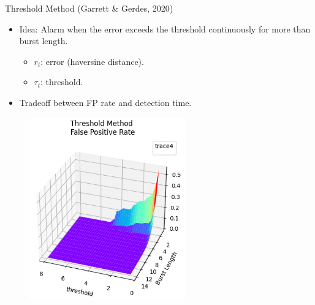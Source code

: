 \documentclass[aspectratio=169, 8pt]{beamer}
\begin{document}
\begin{frame}


\begin{columns}[T]

    \begin{column}{0.5\linewidth}
    
        \begin{block}{Threshold Method (Garrett \& Gerdes, 2020)}
            \begin{itemize}
                \item Idea: Alarm when the error exceeds the threshold continuously for more than burst length.
                \begin{itemize}
                    \item $r_t$: error (haversine distance).\\
                    \item $\tau_t$: threshold.\\
                \end{itemize}
                \item Tradeoff between FP rate and detection time.
            \end{itemize}
        \end{block}

        \begin{figure}
            \centering
            \includegraphics[width = 0.6\textwidth]{images/Garrett_FP_rate.png}
            \label{fig:enter-label}
        \end{figure}        
        
    \end{column}
    

\end{columns}
\end{frame}
\end{document}
